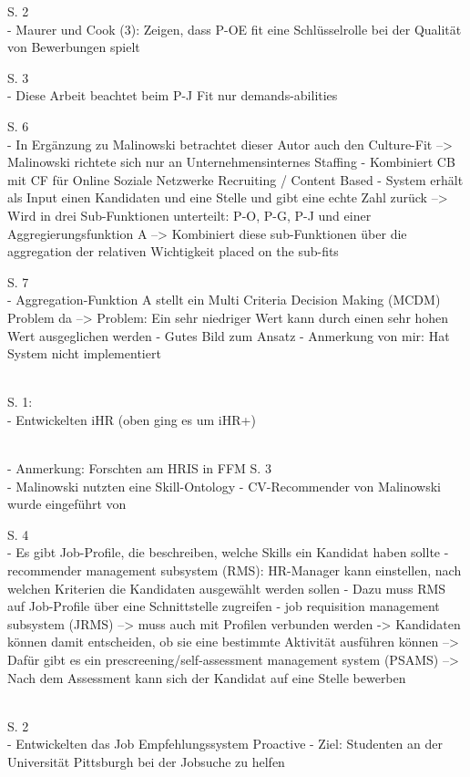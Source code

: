 S. 2\\
- Maurer und Cook (3): Zeigen, dass P-OE fit eine Schlüsselrolle bei der Qualität von Bewerbungen spielt

S. 3\\
- Diese Arbeit beachtet beim P-J Fit nur demands-abilities

S. 6\\
- In Ergänzung zu Malinowski betrachtet dieser Autor auch den Culture-Fit --> Malinowski richtete sich nur an Unternehmensinternes Staffing
- Kombiniert CB mit CF für Online Soziale Netzwerke Recruiting / Content Based
- System erhält als Input einen Kandidaten und eine Stelle und gibt eine echte Zahl zurück --> Wird in drei Sub-Funktionen unterteilt: P-O, P-G, P-J und einer Aggregierungsfunktion A --> Kombiniert diese sub-Funktionen über die aggregation der relativen Wichtigkeit placed on the sub-fits

S. 7\\
- Aggregation-Funktion A stellt ein Multi Criteria Decision Making (MCDM) Problem da --> Problem: Ein sehr niedriger Wert kann durch einen sehr hohen Wert ausgeglichen werden
- Gutes Bild zum Ansatz
- Anmerkung von mir: Hat System nicht implementiert

\textcite{hong:2013}\\
S. 1:\\
- Entwickelten iHR (oben ging es um iHR+)

\textcite{laumer:2009}\\
- Anmerkung: Forschten am HRIS in FFM
S. 3\\
- Malinowski nutzten eine Skill-Ontology
- CV-Recommender von Malinowski wurde eingeführt von \textcite{faerber:2003}

S. 4\\
- Es gibt Job-Profile, die beschreiben, welche Skills ein Kandidat haben sollte
- recommender management subsystem (RMS): HR-Manager kann einstellen, nach welchen Kriterien die Kandidaten ausgewählt werden sollen
- Dazu muss RMS auf Job-Profile über eine Schnittstelle zugreifen
- job requisition management subsystem (JRMS) --> muss auch mit Profilen verbunden werden -> Kandidaten können damit entscheiden, ob sie eine bestimmte Aktivität ausführen können --> Dafür gibt es ein prescreening/self-assessment management system (PSAMS) --> Nach dem Assessment kann sich der Kandidat auf eine Stelle bewerben

\textcite{lee:2007}\\
S. 2\\
- Entwickelten das Job Empfehlungssystem Proactive
- Ziel: Studenten an der Universität Pittsburgh bei der Jobsuche zu helfen

